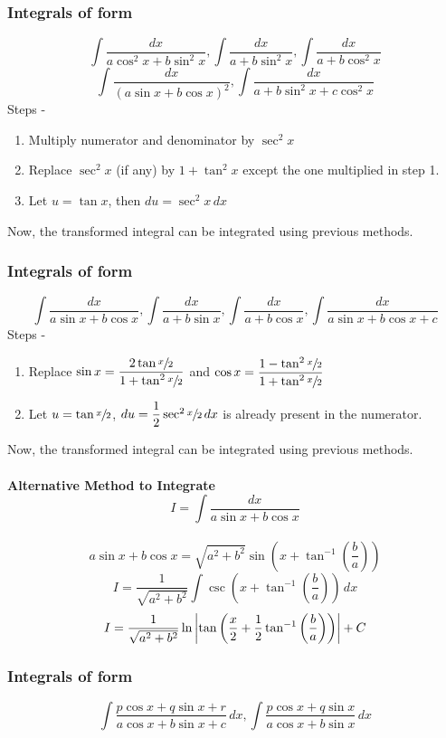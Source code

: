 \documentclass{article}
\begin{document}
\subsubsection{Integrals of form}
$$\int \dfrac{dx}{a \cos^2 x+b\sin ^2 x}, \int \dfrac{dx}{a+b \sin^2 x}, \int \dfrac{dx}{a+b\cos^2 x}$$
$$\int \dfrac{dx}{\left(a\sin x+b\cos x\right)^2}, \int \dfrac{dx}{a+b\sin^2 x+c \cos ^2 x}$$
Steps - 
\begin{enumerate}[1.]
    \item Multiply numerator and denominator by $\sec^2 x$ 
    \item Replace $\sec^2 x$ (if any) by $1+\tan^2 x$  except the one multiplied in step 1.
    \item Let $u=\tan x$, then $du=\sec^2 x \, dx$
\end{enumerate}
Now, the transformed integral can be integrated using previous methods.

\subsubsection{Integrals of form }
$$\int \dfrac{dx}{a\sin x +b \cos x}, \int \dfrac{dx}{a+b\sin x}, \int \dfrac{dx}{a+b\cos x}, \int \dfrac{dx}{a\sin x + b \cos x + c} $$
Steps - 
\begin{enumerate}[1.]
    \item Replace $\sin x = \dfrac{2\tan \sfrac{x}{2}}{1+\tan^2 \sfrac{x}{2}}$ and $\cos x = \dfrac{1-\tan^2 \sfrac{x}{2}}{1+\tan^2 \sfrac{x}{2}}$
    \item Let $u=\tan \sfrac{x}{2}$, $du= \dfrac{1}{2} \sec^2 \sfrac{x}{2} \, dx$ is already present in the numerator.
\end{enumerate}
Now, the transformed integral can be integrated using previous methods.

\paragraph{Alternative Method to Integrate $$I=\int \dfrac{dx}{a\sin x + b \cos x}$$}

$$a\sin x + b \cos x = \sqrt{a^2+b^2} \sin (x+\tan^{-1} \left(\dfrac{b}{a}\right)) $$
$$I=\dfrac{1}{\sqrt{a^2+b^2}}\int \csc \left(x+ \tan^{-1}\left(\dfrac{b}{a}\right) \right) \, dx $$
$$I=\dfrac{1}{\sqrt{a^2+b^2}}\ln \abs{\tan \left(\dfrac{x}{2}+ \dfrac{1}{2} \tan^{-1} \left(\dfrac{b}{a}\right) \right)}+C$$
\subsubsection{Integrals of form }
$$\int \dfrac{p\cos x + q \sin x +r}{a \cos x + b \sin x + c} \, dx , \int \dfrac{p \cos x + q \sin x }{a \cos x + b \sin x} \, dx $$
\end{document}
